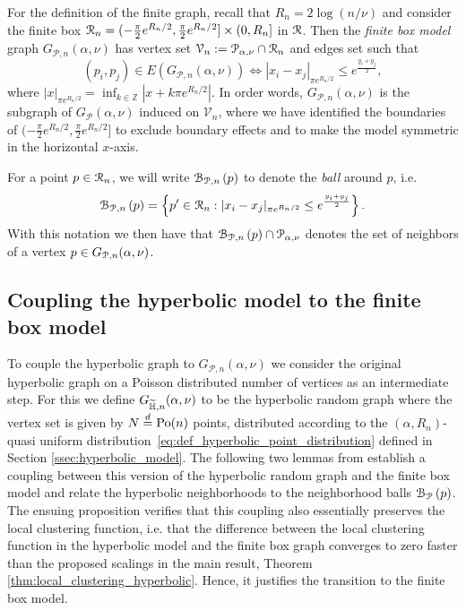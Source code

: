 For the definition of the finite graph, recall that $R_n = 2\log(n/\nu)$ and consider the finite box ${\mathcal R}_n = (-\frac{\pi}{2}e^{R_n/2}, \frac{\pi}{2}e^{R_n/2}] \times (0, R_n]$ in ${\mathcal R}$. Then the \emph{finite box model} graph $G_{\mathcal{P},n}(\alpha, \nu)$ has vertex set $\mathcal{V}_n := \mathcal{P}_{\alpha, \nu} \cap {\mathcal R}_n$ and edges set such that
\[
	(p_i, p_j) \in E(G_{\mathcal{P},n}(\alpha, \nu)) \iff |x_i - x_j|_{\pi e^{R_n/2}} \leq e^{\frac{y_i + y_j}{2}},
\]
where $|x|_{\pi e^{R_n/2}} = \inf_{k \in \mathbb{Z}} |x + k \pi e^{R_n/2}|$. In order words, $G_{\mathcal{P},n}(\alpha, \nu)$ is the subgraph of $G_{\mathcal{P}}(\alpha, \nu)$ induced on $\mathcal{V}_n$, where we have identified the boundaries of $(-\frac{\pi}{2}e^{R_n/2}, \frac{\pi}{2}e^{R_n/2}]$ to exclude boundary effects and to make the model symmetric in the horizontal $x$-axis. 

For a point $p \in {\mathcal R}_n$, we will write ${\mathcal B}_{{\mathcal P},n}\left(p\right)$ to denote the \emph{ball} around $p$, i.e.
\begin{equation}\label{eq:def_ball_P_n}
	{\mathcal B}_{{\mathcal P},n}\left(p\right) = \left\{p^\prime \in {\mathcal R}_n : |x_i - x_j|_{\pi e^{R_n/2}} \leq e^{\frac{y_i + y_j}{2}}\right\}.
\end{equation}
With this notation we then have that ${\mathcal B}_{{\mathcal P},n}\left(p\right) \cap {\mathcal P}_{\alpha, \nu}$ denotes the set of neighbors of a vertex $p \in G_{{\mathcal P},n}(\alpha,\nu)$.  


\subsection{Coupling the hyperbolic model to the finite box model}\label{ssec:coupling_H_P}

To couple the hyperbolic graph to $G_{\mathcal{P},n}(\alpha, \nu)$ we consider the original hyperbolic graph on a Poisson distributed number of vertices as an intermediate step. For this we define $G_{\widetilde{\mathbb{H}},n}(\alpha, \nu)$ to be the hyperbolic random graph where the vertex set is given by $N \stackrel{d}{=} {\mathrm{Po}}(n)$ points, distributed according to the $(\alpha, R_n)$-quasi uniform distribution~\eqref{eq:def_hyperbolic_point_distribution} defined in Section \ref{ssec:hyperbolic_model}. The following two lemmas from \cite{fountoulakis2018law} establish a coupling between this version of the hyperbolic random graph and the finite box model and relate the hyperbolic neighborhoods to the neighborhood balls ${\mathcal B}_{{\mathcal P}}\left(p\right)$. The ensuing proposition verifies that this coupling also essentially preserves the local clustering function, i.e. that the difference between the local clustering function in the hyperbolic model and the finite box graph converges to zero faster than the proposed scalings in the main result, Theorem \ref{thm:local_clustering_hyperbolic}. Hence, it justifies the transition to the finite box model. 

